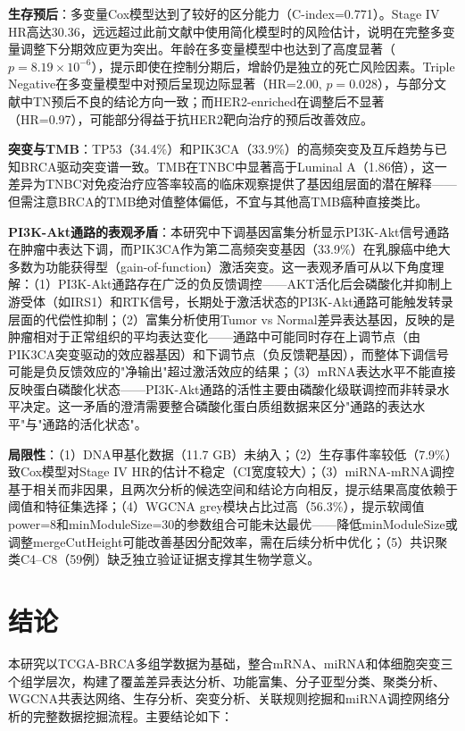 \documentclass[12pt,a4paper,openany]{ctexbook}
\begin{document}
\textbf{生存预后}：多变量Cox模型达到了较好的区分能力（C-index=0.771）。Stage IV HR高达30.36，远远超过此前文献中使用简化模型时的风险估计，说明在完整多变量调整下分期效应更为突出。年龄在多变量模型中也达到了高度显著（$p=8.19\times10^{-6}$），提示即使在控制分期后，增龄仍是独立的死亡风险因素。Triple Negative在多变量模型中对预后呈现边际显著（HR=2.00, $p=0.028$），与部分文献中TN预后不良的结论方向一致；而HER2-enriched在调整后不显著（HR=0.97），可能部分得益于抗HER2靶向治疗的预后改善效应。

\textbf{突变与TMB}：TP53（34.4\%）和PIK3CA（33.9\%）的高频突变及互斥趋势与已知BRCA驱动突变谱一致。TMB在TNBC中显著高于Luminal A（1.86倍），这一差异为TNBC对免疫治疗应答率较高的临床观察提供了基因组层面的潜在解释——但需注意BRCA的TMB绝对值整体偏低，不宜与其他高TMB癌种直接类比。

\noindent\textbf{PI3K-Akt通路的表观矛盾}：本研究中下调基因富集分析显示PI3K-Akt信号通路在肿瘤中表达下调，而PIK3CA作为第二高频突变基因（33.9\%）在乳腺癌中绝大多数为功能获得型（gain-of-function）激活突变。这一表观矛盾可从以下角度理解：（1）PI3K-Akt通路存在广泛的负反馈调控——AKT活化后会磷酸化并抑制上游受体（如IRS1）和RTK信号，长期处于激活状态的PI3K-Akt通路可能触发转录层面的代偿性抑制；（2）富集分析使用Tumor vs Normal差异表达基因，反映的是肿瘤相对于正常组织的平均表达变化——通路中可能同时存在上调节点（由PIK3CA突变驱动的效应器基因）和下调节点（负反馈靶基因），而整体下调信号可能是负反馈效应的"净输出"超过激活效应的结果；（3）mRNA表达水平不能直接反映蛋白磷酸化状态——PI3K-Akt通路的活性主要由磷酸化级联调控而非转录水平决定。这一矛盾的澄清需要整合磷酸化蛋白质组数据来区分"通路的表达水平"与"通路的活化状态"。

\textbf{局限性}：（1）DNA甲基化数据（11.7 GB）未纳入；（2）生存事件率较低（7.9\%）致Cox模型对Stage IV HR的估计不稳定（CI宽度较大）；（3）miRNA-mRNA调控基于相关而非因果，且两次分析的候选空间和结论方向相反，提示结果高度依赖于阈值和特征集选择；（4）WGCNA grey模块占比过高（56.3\%），提示软阈值power=8和minModuleSize=30的参数组合可能未达最优——降低minModuleSize或调整mergeCutHeight可能改善基因分配效率，需在后续分析中优化；（5）共识聚类C4--C8（59例）缺乏独立验证证据支撑其生物学意义。

\chapter{结论}
本研究以TCGA-BRCA多组学数据为基础，整合mRNA、miRNA和体细胞突变三个组学层次，构建了覆盖差异表达分析、功能富集、分子亚型分类、聚类分析、WGCNA共表达网络、生存分析、突变分析、关联规则挖掘和miRNA调控网络分析的完整数据挖掘流程。主要结论如下：
\end{document}
